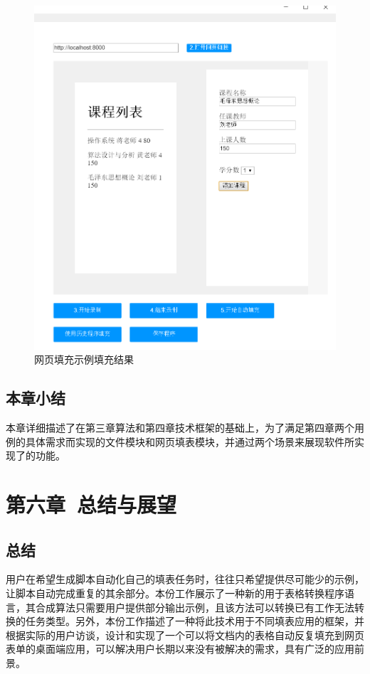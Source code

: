 \documentclass[design, pageheader]{njubachelor}
\begin{document}
\begin{figure}[!htbp]
    \centering
    \includegraphics[width=15cm,keepaspectratio]{figures/ui_2_finish.png}
    \caption{网页填充示例填充结果}
    \label{fig:ui_2_finish}
\end{figure}

\subsection{本章小结}

本章详细描述了在第三章算法和第四章技术框架的基础上，为了满足第四章两个用例的具体需求而实现的文件模块和网页填表模块，并通过两个场景来展现软件所实现了的功能。

\section{第六章~总结与展望}

\subsection{总结}
用户在希望生成脚本自动化自己的填表任务时，往往只希望提供尽可能少的示例，让脚本自动完成重复的其余部分。本份工作展示了一种新的用于表格转换程序语言，其合成算法只需要用户提供部分输出示例，且该方法可以转换已有工作无法转换的任务类型。另外，本份工作描述了一种将此技术用于不同填表应用的框架，并根据实际的用户访谈，设计和实现了一个可以将文档内的表格自动反复填充到网页表单的桌面端应用，可以解决用户长期以来没有被解决的需求，具有广泛的应用前景。
\end{document}

